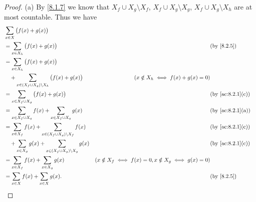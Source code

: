 \begin{proof}{(a)}
	By \cref{8.1.7} we know that \(X_f \cup X_g \setminus X_f\), \(X_f \cup X_g \setminus X_g\), \(X_f \cup X_g \setminus X_h\) are at most countable.
	Thus we have
	\begin{align*}
		 & \sum_{x \in X} \big(f(x) + g(x)\big)                                                                                                                                       \\
		 & = \sum_{x \in X_h} \big(f(x) + g(x)\big)                                       &                                                          & \by{8.2.5}                     \\
		 & = \sum_{x \in X_h} \big(f(x) + g(x)\big)                                                                                                                                   \\
		 & \quad + \sum_{x \in (X_f \cup X_g) \setminus X_h} \big(f(x) + g(x)\big)        & (x \notin X_h \iff f(x) + g(x) = 0)                                                       \\
		 & = \sum_{x \in X_f \cup X_g} \big(f(x) + g(x)\big)                              &                                                          & \text{(by \cref{ac:8.2.1}(c))} \\
		 & = \sum_{x \in X_f \cup X_g} f(x) + \sum_{x \in X_f \cup X_g} g(x)              &                                                          & \text{(by \cref{ac:8.2.1}(a))} \\
		 & = \sum_{x \in X_f} f(x) + \sum_{x \in (X_f \cup X_g) \setminus X_f} f(x)       &                                                          & \text{(by \cref{ac:8.2.1}(c))} \\
		 & \quad + \sum_{x \in X_g} g(x) + \sum_{x \in (X_f \cup X_g) \setminus X_g} g(x) &                                                          & \text{(by \cref{ac:8.2.1}(c))} \\
		 & = \sum_{x \in X_f} f(x) + \sum_{x \in X_g} g(x)                                & (x \notin X_f \iff f(x) = 0, x \notin X_g \iff g(x) = 0)                                  \\
		 & = \sum_{x \in X} f(x) + \sum_{x \in X} g(x).                                   &                                                          & \by{8.2.5}
	\end{align*}
\end{proof}

